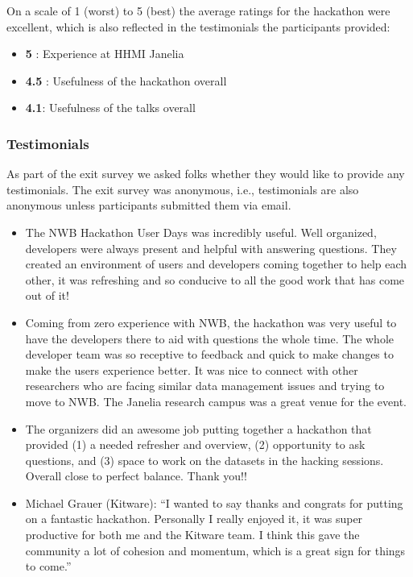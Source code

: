 \documentclass{article}
\begin{document}
\noindent On a scale of 1 (worst) to 5 (best) the average ratings for the hackathon were excellent, which is also reflected in the testimonials the participants provided:
\begin{itemize}
    \item \textbf{5} : Experience at HHMI Janelia
    \item \textbf{4.5} : Usefulness of the hackathon overall
    \item \textbf{4.1}: Usefulness of the talks overall
\end{itemize}


\subsubsection*{Testimonials}
As part of the exit survey we asked folks whether they would like to provide any testimonials. The exit survey was anonymous, i.e.,
testimonials are also anonymous unless participants submitted them via email. 

\begin{itemize}
    \item The NWB Hackathon User Days was incredibly useful. Well organized, developers were always present and helpful with answering questions. They created an environment of users and developers coming together to help each other, it was refreshing and so conducive to all the good work that has come out of it!
    \item Coming from zero experience with NWB, the hackathon was very useful to have the developers there to aid with questions the whole time. The whole developer team was so receptive to feedback and quick to make changes to make the users experience better. It was nice to connect with other researchers who are facing similar data management issues and trying to move to NWB. The Janelia research campus was a great venue for the event.
    \item The organizers did an awesome job putting together a hackathon that provided (1) a needed refresher and overview, (2) opportunity to ask questions, and (3) space to work on the datasets in the hacking sessions. Overall close to perfect balance. Thank you!!
    \item Michael Grauer (Kitware):  ``I wanted to say thanks and congrats for putting on a fantastic hackathon. Personally I
really enjoyed it, it was super productive for both me and the Kitware team. I think 
this gave the community a lot of cohesion and momentum, which is a great sign for things 
to come.''
\end{itemize}
\end{document}
